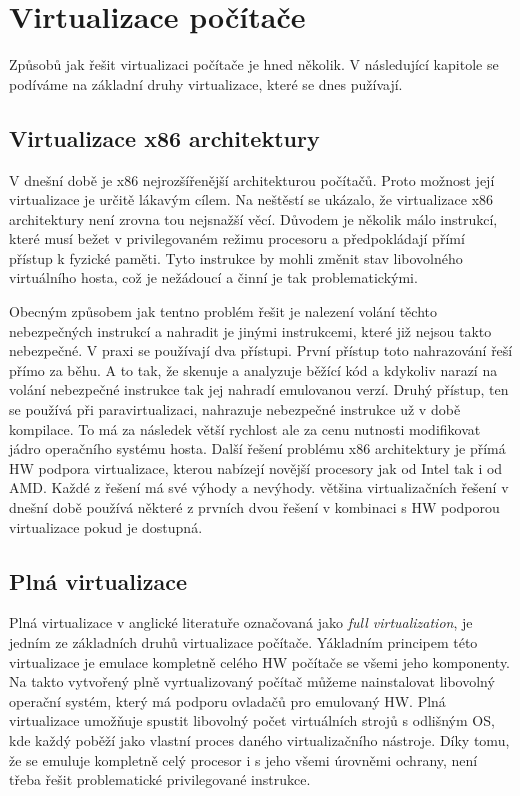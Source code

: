 \section{Virtualizace počítače}
Způsobů jak řešit virtualizaci počítače je hned několik. V následující kapitole se podíváme na základní druhy virtualizace, které se dnes pužívají.

\subsection{Virtualizace x86 architektury}
V dnešní době je x86 nejrozšířenější architekturou počítačů. Proto možnost její virtualizace je určitě lákavým cílem. Na neštěstí se ukázalo, že virtualizace x86 architektury není zrovna tou nejsnažší věcí. Důvodem je několik málo instrukcí, které musí bežet v privilegovaném režimu procesoru a předpokládají přímí přístup k fyzické paměti. Tyto instrukce by mohli změnit stav libovolného virtuálního hosta, což je nežádoucí a činní je tak problematickými.

Obecným způsobem jak tentno problém řešit je nalezení volání těchto nebezpečných instrukcí a nahradit je jinými instrukcemi, které již nejsou takto nebezpečné. V praxi se používají dva přístupi. První přístup toto nahrazování řeší přímo za běhu. A to tak, že skenuje a analyzuje běžící kód a kdykoliv narazí na volání nebezpečné instrukce tak jej nahradí emulovanou verzí. Druhý přístup, ten se používá při paravirtualizaci, nahrazuje nebezpečné instrukce už v době kompilace. To má za následek větší rychlost ale za cenu nutnosti modifikovat jádro operačního systému hosta. Další řešení problému x86 architektury je přímá HW podpora virtualizace, kterou nabízejí novější procesory jak od Intel tak i od AMD. Každé z řešení má své výhody a nevýhody. většina virtualizačních řešení v dnešní době používá některé z prvních dvou řešení v kombinaci s HW podporou virtualizace pokud je dostupná.

\subsection{Plná virtualizace}
Plná virtualizace v anglické literatuře označovaná jako \emph{full virtualization}, je jedním ze základních druhů virtualizace počítače. Yákladním principem této virtualizace je emulace kompletně celého HW počítače se všemi jeho komponenty. Na takto vytvořený plně vyrtualizovaný počítač můžeme nainstalovat libovolný operační systém, který má podporu ovladačů pro emulovaný HW. Plná virtualizace umožňuje spustit libovolný počet virtuálních strojů s odlišným OS, kde každý poběží jako vlastní proces daného virtualizačního nástroje. Díky tomu, že se emuluje kompletně celý procesor i s jeho všemi úrovněmi ochrany, není třeba řešit problematické privilegované instrukce.

